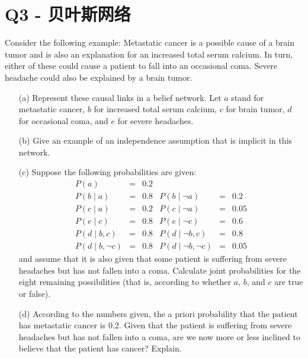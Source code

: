 \documentclass[a4paper, 11pt]{article}
\begin{document}
\section{Q3 - 贝叶斯网络}
\begin{question}\normalfont
Consider the following example: Metastatic cancer is a possible cause of a brain tumor and is also an explanation for an increased total serum calcium. In turn, either of these could cause a patient to fall into an occasional coma. Severe headache could also be explained by a brain tumor.
\begin{itemize}
    \item [(a)] Represent these causal links in a belief network. Let $a$ stand for metastatic cancer, $b$ for increased total serum calcium, $c$ for brain tumor, $d$ for occasional coma, and $e$ for severe headaches.
    \item [(b)] Give an example of an independence assumption that is implicit in this network.
    \item [(c)] Suppose the following probabilities are given:
\[\begin{array}{rllrll}
{P(a)} & {=} & {0.2} & {} \\
{P(b \mid a)} & {=} & {0.8} & {P(b \mid \neg a)} & {=} & {0.2} \\
{P(c \mid a)} & {=} & {0.2} & {P(c \mid \neg a)} & {=} & {0.05} \\
{P(e \mid c)} & {=} & {0.8} & {P(e \mid \neg c)} & {=} & {0.6} \\
{P(d \mid b, c)} & {=} & {0.8} & {P(d \mid \neg b, c)} & {=} & {0.8} \\
{P(d \mid b, \neg c)} & {=} & {0.8} & {P(d \mid \neg b, \neg c)} & {=} & {0.05}
\end{array}\]
    and assume that it is also given that some patient is suffering from severe headaches but has not fallen into a coma. Calculate joint probabilities for the eight remaining possibilities (that is, according to whether $a$, $b$, and $c$ are true or false).
    \item [(d)] According to the numbers given, the a priori probability that the patient has metastatic cancer is $0.2$. Given that the patient is suffering from severe headaches but has not fallen into a coma, are we now more or less inclined to believe that the patient has cancer? Explain.
\end{itemize}
\end{question}
\end{document}
